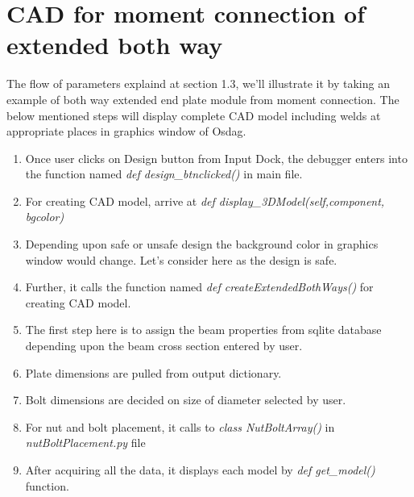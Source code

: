 \section{CAD for moment connection of extended both way}
The flow of parameters explaind at section 1.3, we'll illustrate it by taking an example of both way extended end plate module from moment connection. The below mentioned steps will display complete CAD model including welds at appropriate places in graphics window of Osdag.
\begin{enumerate}
	\item Once user clicks on Design button from Input Dock, the debugger enters into the function named \textit{def design\_btnclicked()} in main file.
	\item For creating CAD model, arrive at \textit{def display\_3DModel(self,component, bgcolor)}
	\item Depending upon safe or unsafe design the background color in graphics window would change. Let's consider here as the design is safe.
	\item  Further, it calls the function named \textit{def createExtendedBothWays()} for creating CAD model.
	\item The first step here is to assign the beam properties from  sqlite database depending upon the beam cross section entered by user.
	\item Plate dimensions are pulled from output dictionary.
	\item Bolt dimensions are decided on size of diameter selected by user.
	\item For nut and bolt placement, it calls to \textit{class NutBoltArray()} in \textit{nutBoltPlacement.py} file
	\item After acquiring all the data, it displays each model by \textit{def get\_model()} function.
\end{enumerate}

